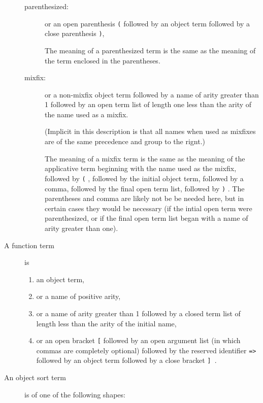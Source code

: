 \documentclass[12pt]{article}
\begin{document}
\begin{description}
\begin{description}
\item[parenthesized:]   or an open parenthesis \verb|(|  followed by an object term followed by a close parenthesis \verb|)|, 

The meaning of a parenthesized term is the same as the meaning of the term enclosed in the parentheses.

\item[mixfix:]   or a non-mixfix object term followed by a name of arity greater than 1 followed by an open term list of length one less than the arity of the name used as a mixfix.

(Implicit in this description is that all names when used as mixfixes are of the same precedence and group to the rignt.)

The meaning of a mixfix term is the same as the meaning of the applicative term beginning with the name used as the mixfix, followed by \verb|(| , followed by the initial object term, followed by a comma, followed by the final open term list, followed by \verb|)| .  The parentheses and comma are likely not be be needed here, but in certain cases they would be necessary (if the intial open term were parenthesized, or if the final open term list began with a name of arity greater than one).

\end{description}

\item [A function term] is 

\begin{enumerate}

\item an object term, 

\item or a name of positive arity, 

\item or a name of arity greater than 1 followed by a closed term list of length less than the arity of the initial name, 

\item or
an open bracket \verb|[| followed by an open argument list (in which commas are completely optional) followed by the reserved identifier {\tt =>} followed by an object term followed by a close bracket \verb|] |.

\end{enumerate}



\item [An object sort term] is of one of the following shapes:


\end{description}
\end{document}
